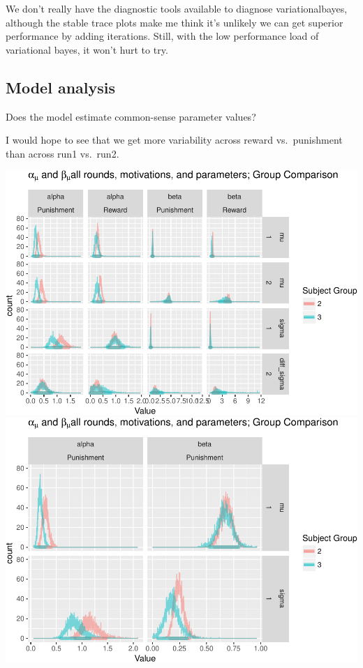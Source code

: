 \documentclass[]{article}
\begin{document}
We don't really have the diagnostic tools available to diagnose
variationalbayes, although the stable trace plots make me think it's
unlikely we can get superior performance by adding iterations. Still,
with the low performance load of variational bayes, it won't hurt to
try.

\subsection{Model analysis}\label{model-analysis}

Does the model estimate common-sense parameter values?

I would hope to see that we get more variability across reward
vs.~punishment than across run1 vs.~run2.

\includegraphics{compare_vb_and_MCMC_files/figure-latex/MCMCresultsGroupComparison-1.pdf}
\includegraphics{compare_vb_and_MCMC_files/figure-latex/MCMCresultsGroupComparison-2.pdf}
\end{document}
